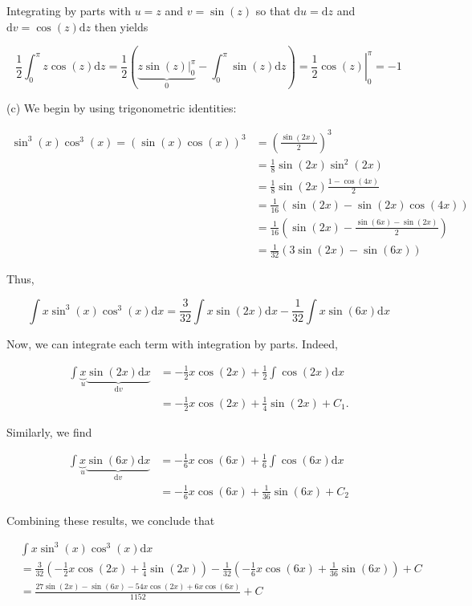 \documentclass[10pt]{article}
\begin{document}
Integrating by parts with $u=z$ and $v=\sin (z)$ so that $\mathrm{d} u=\mathrm{d} z$ and $\mathrm{d} v=\cos (z) \mathrm{d} z$ then yields

$$
\frac{1}{2} \int_{0}^{\pi} z \cos (z) \mathrm{d} z=\frac{1}{2}(\underbrace{\left.z \sin (z)\right|_{0} ^{\pi}}_{0}-\int_{0}^{\pi} \sin (z) \mathrm{d} z)=\left.\frac{1}{2} \cos (z)\right|_{0} ^{\pi}=-1
$$

(c) We begin by using trigonometric identities:

$$
\begin{aligned}
\sin ^{3}(x) \cos ^{3}(x)=(\sin (x) \cos (x))^{3} & =\left(\frac{\sin (2 x)}{2}\right)^{3} \\
& =\frac{1}{8} \sin (2 x) \sin ^{2}(2 x) \\
& =\frac{1}{8} \sin (2 x) \frac{1-\cos (4 x)}{2} \\
& =\frac{1}{16}(\sin (2 x)-\sin (2 x) \cos (4 x)) \\
& =\frac{1}{16}\left(\sin (2 x)-\frac{\sin (6 x)-\sin (2 x)}{2}\right) \\
& =\frac{1}{32}(3 \sin (2 x)-\sin (6 x))
\end{aligned}
$$

Thus,

$$
\int x \sin ^{3}(x) \cos ^{3}(x) \mathrm{d} x=\frac{3}{32} \int x \sin (2 x) \mathrm{d} x-\frac{1}{32} \int x \sin (6 x) \mathrm{d} x
$$

Now, we can integrate each term with integration by parts. Indeed,

$$
\begin{aligned}
\int \underbrace{x}_{u} \underbrace{\sin (2 x) \mathrm{d} x}_{\mathrm{d} v} & =-\frac{1}{2} x \cos (2 x)+\frac{1}{2} \int \cos (2 x) \mathrm{d} x \\
& =-\frac{1}{2} x \cos (2 x)+\frac{1}{4} \sin (2 x)+C_{1} .
\end{aligned}
$$

Similarly, we find

$$
\begin{aligned}
\int \underbrace{x}_{u} \underbrace{\sin (6 x) \mathrm{d} x}_{\mathrm{d} v} & =-\frac{1}{6} x \cos (6 x)+\frac{1}{6} \int \cos (6 x) \mathrm{d} x \\
& =-\frac{1}{6} x \cos (6 x)+\frac{1}{36} \sin (6 x)+C_{2}
\end{aligned}
$$

Combining these results, we conclude that

$$
\begin{aligned}
& \int x \sin ^{3}(x) \cos ^{3}(x) \mathrm{d} x \\
& =\frac{3}{32}\left(-\frac{1}{2} x \cos (2 x)+\frac{1}{4} \sin (2 x)\right)-\frac{1}{32}\left(-\frac{1}{6} x \cos (6 x)+\frac{1}{36} \sin (6 x)\right)+C \\
& =\frac{27 \sin (2 x)-\sin (6 x)-54 x \cos (2 x)+6 x \cos (6 x)}{1152}+C
\end{aligned}
$$
\end{document}
